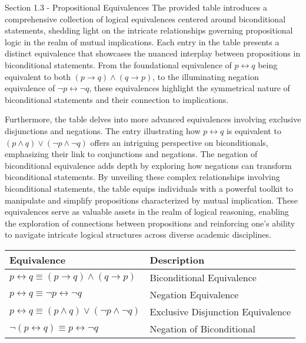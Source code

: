 \begin{notes}{Section 1.3 - Propositional Equivalences}
    The provided table introduces a comprehensive collection of logical equivalences centered around biconditional statements, shedding light on the intricate relationships governing propositional logic in the realm of mutual 
    implications. Each entry in the table presents a distinct equivalence that showcases the nuanced interplay between propositions in biconditional statements. From the foundational equivalence of $p \leftrightarrow q$ being 
    equivalent to both $(p \rightarrow q) \land (q \rightarrow p)$, to the illuminating negation equivalence of $\neg p \leftrightarrow \neg q$, these equivalences highlight the symmetrical nature of biconditional statements 
    and their connection to implications.

    Furthermore, the table delves into more advanced equivalences involving exclusive disjunctions and negations. The entry illustrating how $p \leftrightarrow q$ is equivalent to $(p \land q) \lor (\neg p \land \neg q)$ offers 
    an intriguing perspective on biconditionals, emphasizing their link to conjunctions and negations. The negation of biconditional equivalence adds depth by exploring how negations can transform biconditional statements. By 
    unveiling these complex relationships involving biconditional statements, the table equips individuals with a powerful toolkit to manipulate and simplify propositions characterized by mutual implication. These equivalences 
    serve as valuable assets in the realm of logical reasoning, enabling the exploration of connections between propositions and reinforcing one's ability to navigate intricate logical structures across diverse academic disciplines.

    \begin{center}
        \begin{tabular}{|l|l|}
            \hline Equivalence & Description \\ \hline
            $p \leftrightarrow q \equiv (p \rightarrow q) \land (q \rightarrow p)$ & Biconditional Equivalence \\
            $p \leftrightarrow q \equiv \neg p \leftrightarrow \neg q$ & Negation Equivalence \\
            $p \leftrightarrow q \equiv (p \land q) \lor (\neg p \land \neg q)$ & Exclusive Disjunction Equivalence \\
            $\neg (p \leftrightarrow q) \equiv p \leftrightarrow \neg q$ & Negation of Biconditional \\
            \hline
        \end{tabular}            
    \end{center}


\end{notes}
